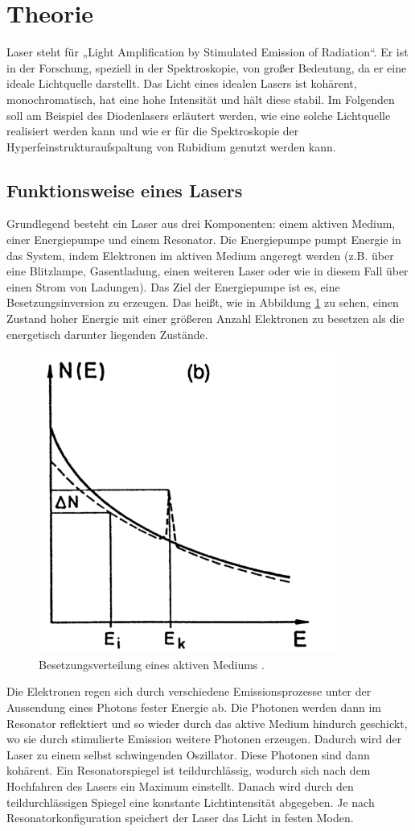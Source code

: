 \section{Theorie}
\label{sec:Theorie}
Laser steht für „Light Amplification by Stimulated Emission of Radiation“.
Er ist in der Forschung, speziell in der Spektroskopie, von großer Bedeutung, da er eine ideale Lichtquelle darstellt.
Das Licht eines idealen Lasers ist kohärent, monochromatisch, hat eine hohe Intensität und hält diese stabil.
Im Folgenden soll am Beispiel des Diodenlasers erläutert werden, wie eine solche Lichtquelle realisiert werden kann und 
wie er für die Spektroskopie der Hyperfeinstrukturaufspaltung von Rubidium genutzt werden kann.
\subsection{Funktionsweise eines Lasers}
Grundlegend besteht ein Laser aus drei Komponenten: einem aktiven Medium, einer Energiepumpe und einem Resonator.
Die Energiepumpe pumpt Energie in das System, indem Elektronen im aktiven Medium angeregt werden (z.B. über eine Blitzlampe, Gasentladung, einen weiteren Laser oder wie in diesem Fall über einen Strom von Ladungen).
Das Ziel der Energiepumpe ist es, eine Besetzungsinversion zu erzeugen. Das heißt, wie in Abbildung \ref{fig:inv} zu sehen, einen Zustand hoher Energie mit einer größeren Anzahl Elektronen zu besetzen 
als die energetisch darunter liegenden Zustände.
\begin{figure}[H]
    \centering
    \includegraphics[scale=0.9]{pictures/Inv.png}
    \caption{Besetzungsverteilung eines aktiven Mediums \cite{Demtröder}.}
    \label{fig:inv}
\end{figure}
\noindent Die Elektronen regen sich durch verschiedene Emissionsprozesse unter der Aussendung eines Photons fester Energie ab.
Die Photonen werden dann im Resonator reflektiert und so wieder durch das aktive Medium hindurch geschickt,
wo sie durch stimulierte Emission weitere Photonen erzeugen. Dadurch wird der Laser zu einem selbst schwingenden Oszillator.
Diese Photonen sind dann kohärent. Ein Resonatorspiegel ist teildurchlässig, wodurch sich nach dem Hochfahren des Lasers ein Maximum einstellt. Danach wird durch den teildurchlässigen
Spiegel eine konstante Lichtintensität abgegeben. Je nach Resonatorkonfiguration speichert der Laser das Licht in festen Moden.

